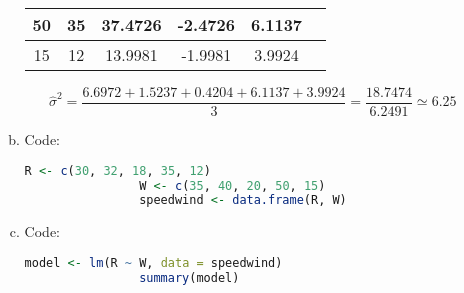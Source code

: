 \documentclass[12pt]{article}
\begin{document}
\begin{enumerate}[1.]
\begin{enumerate}[(a)]
\begin{center}
\begin{tabular}{|c|c|c|c|c|c|}
                    50 & 35 & 37.4726 & -2.4726 & 6.1137 \\
                    \hline
                    15 & 12 & 13.9981 & -1.9981 & 3.9924 \\
                    \hline
                \end{tabular}
                \[ \hat{\sigma}^2 = \frac{6.6972 + 1.5237 + 0.4204 + 6.1137 + 3.9924}{3} = \frac{18.7474}{6.2491} \simeq 6.25 \]
            \end{center}
            \item Code:
            \begin{lstlisting}[language=R]
                R <- c(30, 32, 18, 35, 12)
                W <- c(35, 40, 20, 50, 15)
                speedwind <- data.frame(R, W)
            \end{lstlisting}
            \item Code:
            \begin{lstlisting}[language=R]
                model <- lm(R ~ W, data = speedwind)
                summary(model)
            \end{lstlisting}
            
        \end{enumerate}
\end{enumerate}
\end{document}
